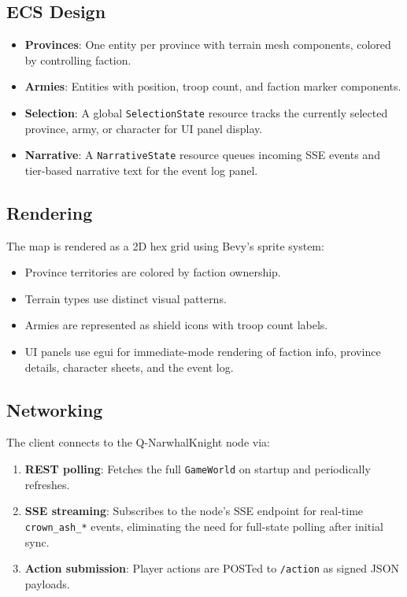 \documentclass[a4paper, 11pt]{article}
\begin{document}
\subsection{ECS Design}

\begin{itemize}
  \item \textbf{Provinces}: One entity per province with terrain mesh
    components, colored by controlling faction.
  \item \textbf{Armies}: Entities with position, troop count, and faction
    marker components.
  \item \textbf{Selection}: A global \texttt{SelectionState} resource tracks
    the currently selected province, army, or character for UI panel display.
  \item \textbf{Narrative}: A \texttt{NarrativeState} resource queues
    incoming SSE events and tier-based narrative text for the event log panel.
\end{itemize}

\subsection{Rendering}

The map is rendered as a 2D hex grid using Bevy's sprite system:

\begin{itemize}
  \item Province territories are colored by faction ownership.
  \item Terrain types use distinct visual patterns.
  \item Armies are represented as shield icons with troop count labels.
  \item UI panels use egui for immediate-mode rendering of faction info,
    province details, character sheets, and the event log.
\end{itemize}

\subsection{Networking}

The client connects to the Q-NarwhalKnight node via:

\begin{enumerate}
  \item \textbf{REST polling}: Fetches the full \texttt{GameWorld} on
    startup and periodically refreshes.
  \item \textbf{SSE streaming}: Subscribes to the node's SSE endpoint for
    real-time \texttt{crown\_ash\_*} events, eliminating the need for
    full-state polling after initial sync.
  \item \textbf{Action submission}: Player actions are POSTed to
    \texttt{/action} as signed JSON payloads.
\end{enumerate}
\end{document}
